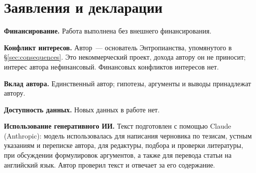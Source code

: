 \documentclass[11pt,a4paper]{article}
\newcommand{\Sref}[1]{\hyperref[#1]{\S\ref{#1}}}
\begin{document}
\section*{Заявления и декларации}

\noindent\textbf{Финансирование.} Работа выполнена без внешнего финансирования.

\noindent\textbf{Конфликт интересов.} Автор~--- основатель Энтропианства, упомянутого в \Sref{sec:consequences}. Это некоммерческий проект, дохода автору он не приносит; интерес автора нефинансовый. Финансовых конфликтов интересов нет.

\noindent\textbf{Вклад автора.} Единственный автор; гипотезы, аргументы и выводы принадлежат автору.

\noindent\textbf{Доступность данных.} Новых данных в работе нет.

\noindent\textbf{Использование генеративного ИИ.} Текст подготовлен с помощью Claude (Anthropic): модель использовалась для написания черновика по тезисам, устным указаниям и переписке автора, для редактуры, подбора и проверки литературы, при обсуждении формулировок аргументов, а также для перевода статьи на английский язык. Автор проверил текст и отвечает за его содержание.



\end{document}
